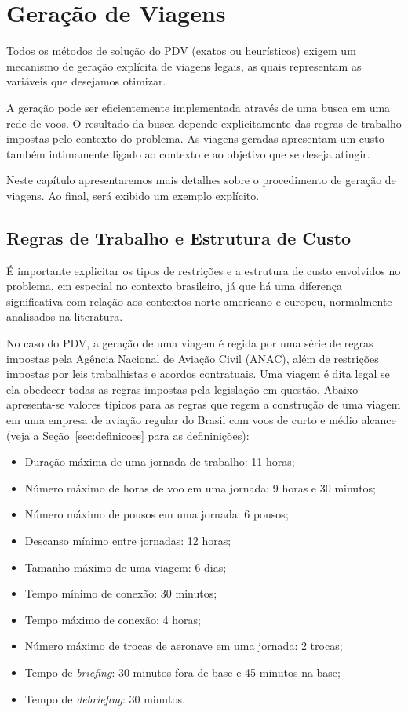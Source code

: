 \zerar
\chapter{Geração de Viagens}
\label{cap:geracao}

Todos os métodos de solução do PDV (exatos ou heurísticos) exigem um mecanismo de geração 
explícita de viagens legais, as quais representam as variáveis que desejamos otimizar. 

A geração pode ser eficientemente implementada através de uma busca em uma rede de voos. 
O resultado da busca depende explicitamente das regras de trabalho impostas pelo contexto do
problema. As viagens geradas apresentam um custo também intimamente ligado ao contexto e ao 
objetivo que se deseja atingir. 

Neste capítulo apresentaremos mais detalhes sobre o procedimento de geração de viagens. Ao final,
será exibido um exemplo explícito.


\section{Regras de Trabalho e Estrutura de Custo}
\label{sec:regras_e_custos}

É importante explicitar os tipos de restrições e a estrutura de custo envolvidos no problema, em 
especial no contexto brasileiro, já que há uma diferença significativa com relação aos contextos 
norte-americano e europeu, normalmente analisados na literatura.

No caso do PDV, a geração de uma viagem é regida por uma série de regras impostas pela Agência
Nacional de Aviação Civil (ANAC), além de restrições impostas por leis trabalhistas e acordos
contratuais. Uma viagem é dita legal se ela obedecer todas as regras impostas pela legislação em
questão. Abaixo apresenta-se valores típicos para as regras que regem a construção de uma viagem em
uma empresa de aviação regular do Brasil com voos de curto e médio alcance (veja a
Seção~\ref{sec:definicoes} para as defininições):

\begin{itemize}
	\item Duração máxima de uma jornada de trabalho: 11 horas;
	\item Número máximo de horas de voo em uma jornada: 9 horas e 30 minutos;
	\item Número máximo de pousos em uma jornada: 6 pousos;
	\item Descanso mínimo entre jornadas: 12 horas;
	\item Tamanho máximo de uma viagem: 6 dias;
	\item Tempo mínimo de conexão: 30 minutos;
	\item Tempo máximo de conexão: 4 horas;
	\item Número máximo de trocas de aeronave em uma jornada: 2 trocas;
	\item Tempo de {\it briefing}: 30 minutos fora de base e 45 minutos na base;
	\item Tempo de {\it debriefing}: 30 minutos.
\end{itemize}

